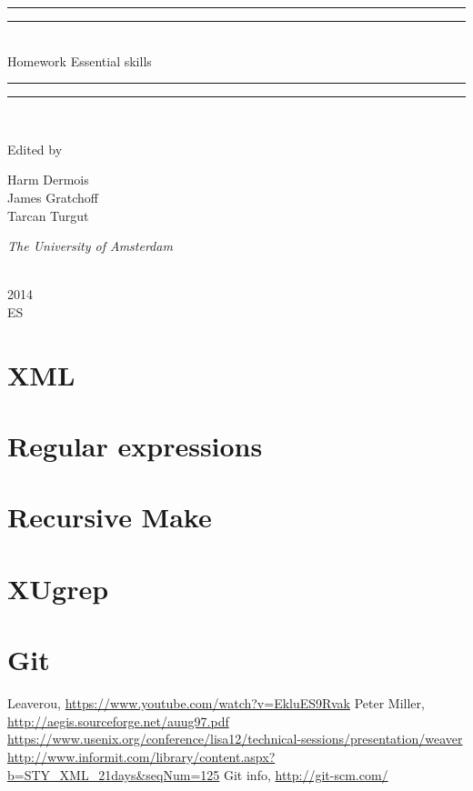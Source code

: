 \documentclass{article}
\newcommand*{\plogo}{\fbox{$\mathcal{PL}$}}
\newcommand*{\titleGP}{\begingroup
\centering %
\vspace*{\baselineskip} %

\vspace*{2\baselineskip} %

\vspace*{2\baselineskip} %

\vspace*{2\baselineskip} %

\rule{\textwidth}{1.6pt}\vspace*{-\baselineskip}\vspace*{2pt} %
\rule{\textwidth}{0.4pt}\\[\baselineskip] %

{\LARGE Homework Essential skills}\\[0.2\baselineskip] %

\rule{\textwidth}{0.4pt}\vspace*{-\baselineskip}\vspace{3.2pt} %
\rule{\textwidth}{1.6pt}\\[\baselineskip] %


\vspace*{2\baselineskip} %

Edited by \\[\baselineskip]
{\Large Harm Dermois \\ James Gratchoff \\ Tarcan Turgut\par} %
{\itshape The University of Amsterdam \par} %

\vfill %

\vspace*{2\baselineskip} %

\plogo \\[0.3\baselineskip] %
{\scshape 2014} \\[0.3\baselineskip] %
{\large ES}\par %

\vspace*{2\baselineskip} %

\endgroup}
\begin{document}
 

\pagestyle{empty} %

\titleGP %

\vspace*{10\baselineskip} %
\tableofcontents


\vspace*{25\baselineskip}
\section{XML}

\section{Regular expressions}

\section{Recursive Make}

\section{XUgrep}

\section{Git}


\vspace*{2\baselineskip} %

\begin{thebibliography}{9}
	Leaverou,
	\url{https://www.youtube.com/watch?v=EkluES9Rvak}
	Peter Miller,
	\url{http://aegis.sourceforge.net/auug97.pdf}
	\url{https://www.usenix.org/conference/lisa12/technical-sessions/presentation/weaver}
	\url{http://www.informit.com/library/content.aspx?b=STY_XML_21days&seqNum=125}
	Git info,
	\url{http://git-scm.com/}
\end{thebibliography}
\end{document}
